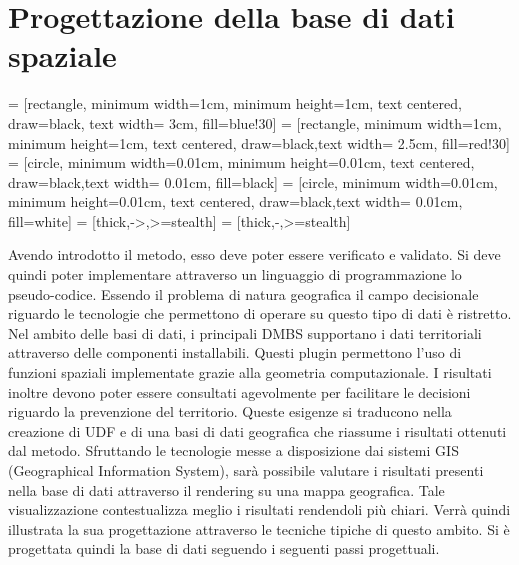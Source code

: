 
\chapter{Progettazione della base di dati spaziale}

 = [rectangle, minimum width=1cm, minimum height=1cm, text centered, draw=black, text width= 3cm, fill=blue!30]
 = [rectangle, minimum width=1cm, minimum height=1cm, text centered, draw=black,text width= 2.5cm, fill=red!30]
 = [circle, minimum width=0.01cm, minimum height=0.01cm, text centered, draw=black,text width= 0.01cm, fill=black]
 = [circle, minimum width=0.01cm, minimum height=0.01cm, text centered, draw=black,text width= 0.01cm, fill=white]
 = [thick,->,>=stealth]
 = [thick,-,>=stealth]

 
Avendo introdotto il metodo, esso deve poter essere verificato e validato. 
Si deve quindi poter implementare attraverso un linguaggio di programmazione lo pseudo-codice. Essendo il problema di natura geografica il campo decisionale riguardo le tecnologie che permettono di operare su questo tipo di dati è ristretto.
Nel ambito delle basi di dati, i principali DMBS supportano i dati territoriali attraverso delle componenti installabili. Questi plugin permettono l'uso di funzioni
spaziali implementate grazie alla geometria computazionale. I risultati inoltre devono poter essere consultati agevolmente per facilitare le decisioni riguardo la prevenzione del territorio. Queste esigenze si traducono nella creazione di UDF e di una basi di dati geografica che riassume i risultati ottenuti dal metodo. Sfruttando le tecnologie messe a disposizione dai sistemi GIS (Geographical Information System), sarà possibile valutare i risultati presenti nella base di dati attraverso il rendering su una mappa geografica. Tale visualizzazione contestualizza meglio i risultati rendendoli più chiari. Verrà quindi illustrata la sua progettazione attraverso le tecniche tipiche di questo ambito.
Si è progettata quindi la base di dati seguendo i seguenti passi progettuali.

